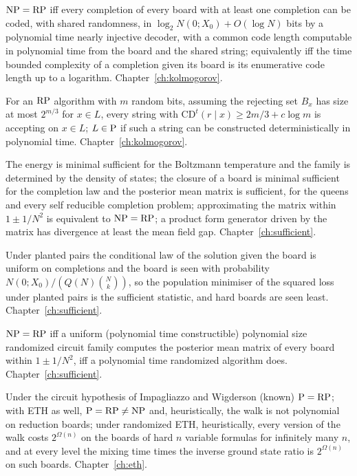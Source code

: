 \begin{description}[style=nextline]
\item[Coding theorem for the queens] $\mathrm{NP} = \mathrm{RP}$ iff every completion of every board with at least one completion can be coded, with shared randomness, in $\log_2 N(0; X_0) + O(\log N)$ bits by a polynomial time nearly injective decoder, with a common code length computable in polynomial time from the board and the shared string; equivalently iff the time bounded complexity of a completion given its board is its enumerative code length up to a logarithm. Chapter~\ref{ch:kolmogorov}.
\item[Incompressible witnesses] For an $\mathrm{RP}$ algorithm with $m$ random bits, assuming the rejecting set $B_x$ has size at most $2^{m/3}$ for $x \in L$, every string with $\mathrm{CD}^t(r \mid x) \ge 2m/3 + c \log m$ is accepting on $x \in L$; $L \in \mathrm{P}$ if such a string can be constructed deterministically in polynomial time. Chapter~\ref{ch:kolmogorov}.
\item[Sufficient statistics] The energy is minimal sufficient for the Boltzmann temperature and the family is determined by the density of states; the closure of a board is minimal sufficient for the completion law and the posterior mean matrix is sufficient, for the queens and every self reducible completion problem; approximating the matrix within $1 \pm 1/N^2$ is equivalent to $\mathrm{NP} = \mathrm{RP}$; a product form generator driven by the matrix has divergence at least the mean field gap. Chapter~\ref{ch:sufficient}.
\item[Planted sampling] Under planted pairs the conditional law of the solution given the board is uniform on completions and the board is seen with probability $N(0; X_0) / (Q(N) \binom{N}{k})$, so the population minimiser of the squared loss under planted pairs is the sufficient statistic, and hard boards are seen least. Chapter~\ref{ch:sufficient}.
\item[The learning problem is the problem] $\mathrm{NP} = \mathrm{RP}$ iff a uniform (polynomial time constructible) polynomial size randomized circuit family computes the posterior mean matrix of every board within $1 \pm 1/N^2$, iff a polynomial time randomized algorithm does. Chapter~\ref{ch:sufficient}.
\item[ETH and the program] Under the circuit hypothesis of Impagliazzo and Wigderson (known) $\mathrm{P} = \mathrm{RP}$; with ETH as well, $\mathrm{P} = \mathrm{RP} \ne \mathrm{NP}$ and, heuristically, the walk is not polynomial on reduction boards; under randomized ETH, heuristically, every version of the walk costs $2^{\Omega(n)}$ on the boards of hard $n$ variable formulas for infinitely many $n$, and at every level the mixing time times the inverse ground state ratio is $2^{\Omega(n)}$ on such boards. Chapter~\ref{ch:eth}.

\end{description}
